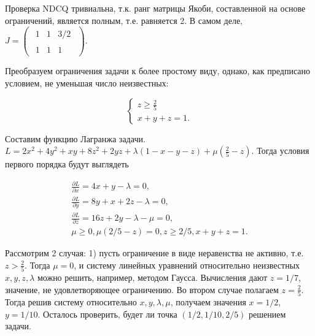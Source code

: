 \begin{solution}
Проверка NDCQ тривиальна, т.к. ранг матрицы Якоби, составленной на основе ограничений, является полным, т.е. равняется 2. В самом деле, $J=\left(\begin{array}{c} {\begin{array}{ccc} {1} & {1} & {3/2} \end{array}} \\ {\begin{array}{ccc} {1} & {1} & {1} \end{array}} \end{array}\right)$.

Преобразуем ограничения задачи к более простому виду, однако, как предписано условием, не уменьшая число неизвестных:

\[
\begin{cases}
z\ge \frac{2}{5} \\
x+y+z=1.
\end{cases}
\] 

Составим функцию Лагранжа задачи. $L=2x^{2} +4y^{2} +xy+8z^{2} +2yz+\lambda (1-x-y-z)+\mu (\frac{2}{5} -z)$. Тогда условия первого порядка будут выглядеть

\[
\begin{array}{l} 
{\frac{\partial L}{\partial x} =4x+y-\lambda =0,} \\ 
{\frac{\partial L}{\partial y} =8y+x+2z-\lambda =0,} \\ 
{\frac{\partial L}{\partial z} =16z+2y-\lambda -\mu =0,} \\ 
{\mu \ge 0,  \mu (2/5-z)=0,  z\ge 2/5,  x+y+z=1.} 
\end{array}
\] 

Рассмотрим 2 случая: 1) пусть ограничение в виде неравенства не активно, т.е.$z>\frac{2}{5} $. Тогда $\mu =0$, и систему линейных уравнений относительно неизвестных $x,y,z,\lambda $ можно решить, например, методом Гаусса. Вычисления дают $z=1/7$, значение, не удовлетворяющее ограничению. Во втором случае полагаем $z=\frac{2}{5} $. Тогда решив систему относительно $x, y, \lambda, \mu $, получаем значения  $x=1/2$, $ y=1/10$. Осталось проверить, будет ли точка $(1/2,1/10,2/5)$ решением задачи. 



\end{solution}
